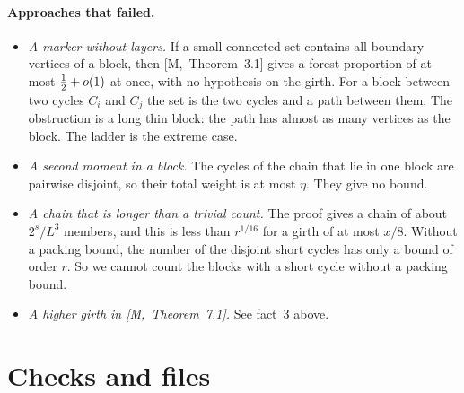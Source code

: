 \documentclass[11pt]{article}
\newcommand{\M}[1]{[M,~#1]}
\begin{document}
\paragraph{Approaches that failed.}
\begin{itemize}[leftmargin=1.2em]
\item \emph{A marker without layers.} If a small connected set contains all boundary vertices of
a block, then \M{Theorem~3.1} gives a forest proportion of at most $\tfrac12+o(1)$ at once, with no
hypothesis on the girth. For a block between two cycles $C_i$ and $C_j$ the set is the two cycles
and a path between them. The obstruction is a long thin block: the path has almost as many
vertices as the block. The ladder is the extreme case.
\item \emph{A second moment in a block.} The cycles of the chain that lie in one block are
pairwise disjoint, so their total weight is at most $\eta$. They give no bound.
\item \emph{A chain that is longer than a trivial count.} The proof gives a chain of about
$2^{s}/L^{3}$ members, and this is less than $r^{1/16}$ for a girth of at most $x/8$. Without a
packing bound, the number of the disjoint short cycles has only a bound of order $r$. So we
cannot count the blocks with a short cycle without a packing bound.
\item \emph{A higher girth in \M{Theorem~7.1}.} See fact~3 above.
\end{itemize}

\section{Checks and files}\label{sec:checks}
\end{document}
